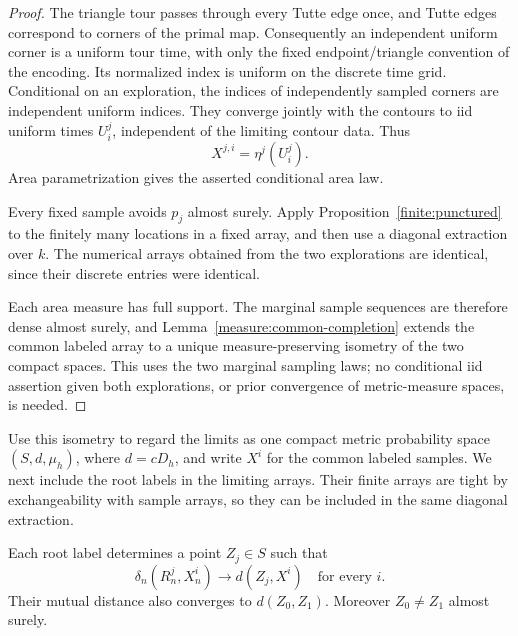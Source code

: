 \begin{proof}
The triangle tour passes through every Tutte edge once, and
Tutte edges correspond to corners of the primal map.
Consequently an independent uniform corner is a uniform tour
time, with only the fixed endpoint/triangle convention of the
encoding.  Its normalized index is uniform on the discrete
time grid.  Conditional on an exploration, the indices of
independently sampled corners are independent uniform
indices.  They converge jointly with the contours to iid
uniform times \(U_i^j\), independent of the limiting contour
data.  Thus
\[
                         X^{j,i}=\eta^j(U_i^j).
\]
Area parametrization gives the asserted conditional area law.

Every fixed sample avoids \(p_j\) almost surely.  Apply
Proposition~\ref{finite:punctured} to the finitely many
locations in a fixed array, and then use a diagonal
extraction over \(k\).  The numerical arrays obtained from
the two explorations are identical, since their discrete
entries were identical.

Each area measure has full support. The marginal sample sequences are
therefore dense almost surely, and Lemma~\ref{measure:common-completion}
extends the common labeled array to a unique measure-preserving isometry
of the two compact spaces. This uses the two marginal sampling laws;
no conditional iid assertion given both explorations, or prior
convergence of metric-measure spaces, is needed.
\end{proof}

Use this isometry to regard the limits as one compact metric
probability space \((S,d,\mu_h)\), where \(d=cD_h\), and write
\(X^i\) for the common labeled samples.  We next include the root labels in
the limiting arrays.  Their finite arrays are tight by
exchangeability with sample arrays, so they can be included
in the same diagonal extraction.

\begin{lemma}
\label{finite:root-completion}
Each root label determines a point \(Z_j\in S\) such that
\[
              \delta_n(R_n^j,X_n^i)\longrightarrow d(Z_j,X^i)
              \quad\text{for every }i.
\]
Their mutual distance also converges to \(d(Z_0,Z_1)\).
Moreover \(Z_0\ne Z_1\) almost surely.
\end{lemma}

